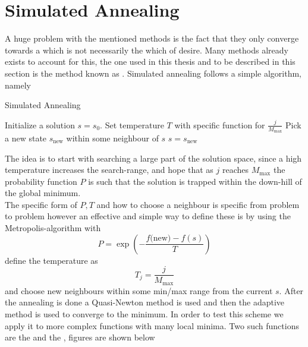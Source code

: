 \section{Simulated Annealing\label{sec:simulated_annealing}}
    A huge problem with the mentioned methods is the fact that they only
    converge towards a  which is not necessarily the
     which of desire. Many methods already exists to
    account for this, the one used in this thesis and to be described in this
    section is the method known as . Simulated
    annealing follows a simple algorithm, namely
        \begin{algorithm}[H]
            \caption{Simulated Annealing\label{alg:simulated_annealing}}
            \begin{algorithmic}[H]
                \State Initialize a solution $s=s_0$. 
                    \State Set temperature $T$ with specific function for
                    $\frac{j}{M_{\text{max}}}$
                    \State Pick a new state $s_{\text{new}}$ within some
                    neighbour of $s$
                        \State $s = s_{\text{new}}$
                    \EndIf
                \EndFor
            \end{algorithmic}
        \end{algorithm}
    The idea is to start with searching a large part of the solution space,
    since a high temperature increases the search-range, and hope that as $j$
    reaches $M_{\text{max}}$ the probability function $P$ is such that the
    solution is trapped within the down-hill of the global minimum. \\ 
    The specific form of $P, T$ and how to choose a neighbour is specific from
    problem to problem however an effective and simple way to define these is
    by using the Metropolis-algorithm with
        \begin{equation}
            P = \exp(-\frac{f({\text{new}) - f(s)}}{T})
        \end{equation}
    define the temperature as
        \begin{equation}
            T_j = \frac{j}{M_{\text{max}}}
        \end{equation}
    and choose new neighbours within some min/max range from the current
    $s$\cite{simaneal}.  After the annealing is done a Quasi-Newton method is
    used and then the adaptive method is used to converge to the minimum. In
    order to test this scheme we apply it to more complex functions with many
    local minima. Two such functions are the  and the
    , figures are shown below
